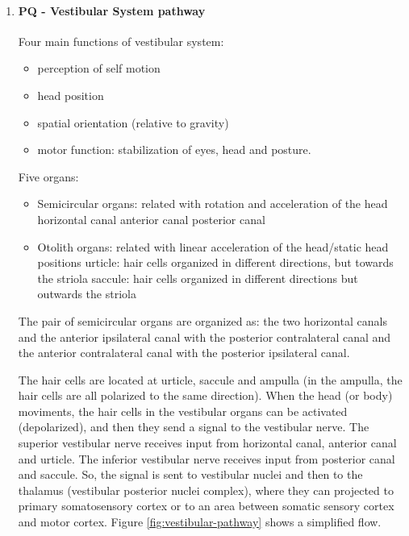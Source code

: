\documentclass[12pt,article,oneside,a4paper]{memoir}
\begin{document}
\begin{enumerate}
\item \paragraph{PQ - Vestibular System pathway}
Four main functions of vestibular system:
\begin{itemize}
\item perception of self motion
\item head position
\item spatial orientation (relative to gravity)
\item motor function: stabilization of eyes, head and posture.
\end{itemize}

Five organs:
\begin{itemize}
\item Semicircular organs: related with rotation and acceleration of the head
\subitem horizontal canal
\subitem anterior canal
\subitem posterior canal
\item Otolith organs: related with linear acceleration of the head/static head positions 
\subitem urticle: hair cells organized in different directions, but towards the striola 
\subitem saccule: hair cells organized in different directions but outwards the striola
\end{itemize}

The pair of semicircular organs are organized as: the two horizontal canals and the anterior ipsilateral canal with the posterior contralateral canal and the anterior contralateral canal with the posterior ipsilateral canal.

The hair cells are located at urticle, saccule and ampulla (in the ampulla, the hair cells are all polarized to the same direction).
When the head (or body) moviments, the hair cells in the vestibular organs can be activated (depolarized), and then they send a signal to the vestibular nerve. The superior vestibular nerve receives input from horizontal canal, anterior canal and urticle. The inferior vestibular nerve receives input from posterior canal and saccule. So, the signal is sent to vestibular nuclei and then to the thalamus (vestibular posterior nuclei complex), where they can projected to primary somatosensory cortex or to an area between somatic sensory cortex and motor cortex. Figure \ref{fig:vestibular-pathway} shows a simplified flow.


\end{enumerate}
\end{document}
